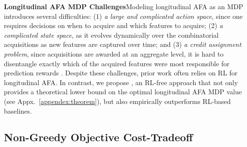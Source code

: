 \textbf{Longitudinal AFA MDP Challenges}\quad Modeling longitudinal AFA as an MDP introduces several difficulties: (1) \emph{a large and complicated action space}, since one requires decisions on when to acquire and which features to acquire; (2) \emph{a complicated state space}, as it evolves dynamically over the combinatorial acquisitions as new features are captured over time; and (3) \emph{a credit assignment problem}, since acquisitions are awarded at an aggregate level, it is hard to disentangle exactly which of the acquired features were most responsible for prediction rewards \citep{li2021active}.
Despite these challenges, prior work \citep{qin2024risk, yoon2019asac, kossen2022active, nguyen2024active} often relies on RL for longitudinal AFA. In contrast, we propose \texttt{\OurMethod}, an RL-free approach that not only provides a theoretical lower bound on the optimal longitudinal AFA MDP value (see Appx.~\ref{appendex:theorem}), but also empirically outperforms RL-based baselines. 


\subsection{Non-Greedy Objective Cost-Tradeoff}


